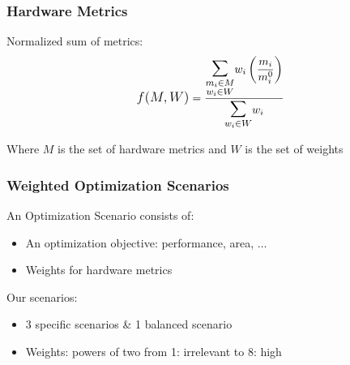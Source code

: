 \documentclass[10pt, compress, xcolor={table,xcdraw,usenames}, aspectratio=169]{beamer}
\begin{document}
\begin{frame}
    \frametitle{Hardware Metrics}
    \begin{block}{\alert{Normalized sum} of metrics:}
        \begin{align*} \label{eq:wnsm}
            \mathlarger{f(M, W)} = \frac{\mathlarger{\mathlarger{\mathlarger{\sum}}}\limits_{\substack{m_i \in M \\ w_i \in W}}{w_i\left(\dfrac{m_i}{m_{i}^{0}}\right)}}{\mathlarger{\mathlarger{\mathlarger{\sum}}}\limits_{w_i \in W}{w_i}}
        \end{align*}

        \begin{center}
            Where $M$ is the set of \alert{hardware metrics} and $W$ is the set
            of \alert{weights}
        \end{center}
    \end{block}
\end{frame}

\begin{frame}
    \frametitle{Weighted Optimization Scenarios}
    \begin{block}{An \alert{Optimization Scenario} consists of:}
        \begin{itemize}
            \item An \alert{optimization objective}: \alert{performance}, \alert{area}, $\dots$
            \item \alert{Weights} for \alert{hardware metrics}
        \end{itemize}
    \end{block}

    \begin{block}{Our scenarios:}
        \begin{itemize}
            \item 3 \alert{specific} scenarios \& 1 \alert{balanced} scenario
            \item Weights: \alert{powers of two} from 1: \alert{irrelevant} to
                8: \alert{high}
        \end{itemize}
    \end{block}
\end{frame}
\end{document}
